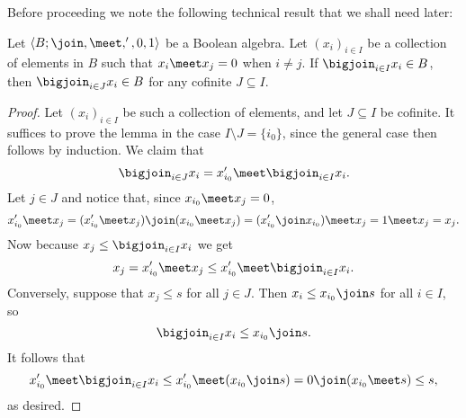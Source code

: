 \documentclass[article, a4paper, 11pt, oneside]{memoir}
\numberwithin{equation}{chapter}
\begin{document}
Before proceeding we note the following technical result that we shall need later:

\begin{lemma}
    \label{thm:refine_join}
    Let $\langle B; \join, \meet, ', 0, 1 \rangle$ be a Boolean algebra. Let $(x_i)_{i \in I}$ be a collection of elements in $B$ such that $x_i \meet x_j = 0$ when $i \neq j$. If $\bigjoin_{i \in I} x_i \in B$, then $\bigjoin_{i \in J} x_i \in B$ for any cofinite\footnotemark{} $J \subseteq I$.
\end{lemma}

\begin{proof}
    Let $(x_i)_{i \in I}$ be such a collection of elements, and let $J \subseteq I$ be cofinite. It suffices to prove the lemma in the case $I \setminus J = \{i_0\}$, since the general case then follows by induction. We claim that
    \begin{equation*}
        \bigjoin_{i \in J} x_i
            = x_{i_0}' \meet \bigjoin_{i \in I} x_i.
    \end{equation*}
    Let $j \in J$ and notice that, since $x_{i_0} \meet x_j = 0$,
    \begin{equation*}
        x_{i_0}' \meet x_j
            = (x_{i_0}' \meet x_j) \join (x_{i_0} \meet x_j)
            = (x_{i_0}' \join x_{i_0}) \meet x_j
            = 1 \meet x_j
            = x_j.
    \end{equation*}
    Now because $x_j \leq \bigjoin_{i \in I} x_i$ we get
    \begin{equation*}
        x_j
            = x_{i_0}' \meet x_j
            \leq x_{i_0}' \meet \bigjoin_{i \in I} x_i.
    \end{equation*}
    Conversely, suppose that $x_j \leq s$ for all $j \in J$. Then $x_i \leq x_{i_0} \join s$ for all $i \in I$, so
    \begin{equation*}
        \bigjoin_{i \in I} x_i
            \leq x_{i_0} \join s.
    \end{equation*}
    It follows that
    \begin{equation*}
        x_{i_0}' \meet \bigjoin_{i \in I} x_i
            \leq x_{i_0}' \meet (x_{i_0} \join s)
            = 0 \join (x_{i_0} \meet s)
            \leq s,
    \end{equation*}
    as desired.
\end{proof}
\end{document}
